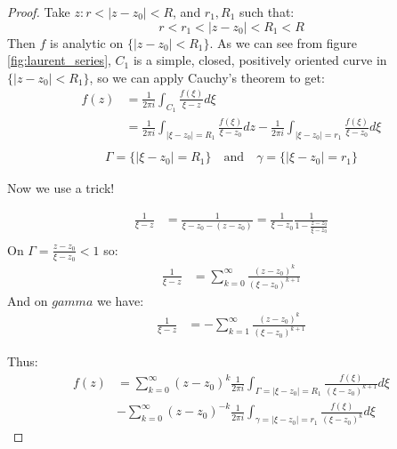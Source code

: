 \begin{proof}
    Take $z : r < |z - z_0| < R$, and $r_1, R_1$ such that:
    $$r < r_1 < |z - z_0| < R_1 < R$$
    Then $f$ is analytic on $\{|z - z_0| < R_1\}$.
    As we can see from figure \ref{fig:laurent_series}, $C_1$ is a simple, closed, positively oriented curve in $\{|z - z_0| < R_1\}$, so we can apply Cauchy's theorem to get:
    \begin{align*}
        f(z) & = \frac{1}{2\pi i} \int_{C_1} \frac{f(\xi)}{\xi - z} d\xi                                                                                          \\
             & = \frac{1}{2\pi i} \int_{|\xi - z_0| = R_1} \frac{f(\xi)}{\xi - z_0} dz  - \frac{1}{2\pi i} \int_{|\xi - z_0| = r_1} \frac{f(\xi)}{\xi - z_0} d\xi \\
    \end{align*}
    \begin{align*}
        \Gamma = \{|\xi - z_0| = R_1\} \quad \text{and} \quad \gamma = \{|\xi - z_0| = r_1\}
    \end{align*}

    Now we use a trick!

    \begin{align*}
        \frac{1}{\xi - z} & = \frac{1}{\xi - z_0 -(z - z_0)} = \frac{1}{\xi - z_0} \frac{1}{1 - \frac{z - z_0}{\xi - z_0}} \\
    \end{align*}
    On $\Gamma = \frac{z - z_0}{\xi - z_0} < 1$  so:
    \begin{align*}
        \frac{1}{\xi - z} & =  \sum_{k=0}^{\infty}\frac{(z - z_0)^{k}}{(\xi - z_0)^{k+1}}
    \end{align*}
    And on $gamma$ we have:
    \begin{align*}
        \frac{1}{\xi - z} & =  -\sum_{k=1}^{\infty}\frac{(z - z_0)^{k}}{(\xi - z_0)^{k+1}}
    \end{align*}

    Thus:
    \begin{align*}
        f(z) & = \sum_{k=0}^{\infty} (z - z_0)^k \frac{1}{2\pi i} \int_{\Gamma = |\xi - z_0| = R_1} \frac{f(\xi)}{(\xi - z_0)^{k+1}} d\xi \\
             & - \sum_{k=0}^{\infty} (z - z_0)^{-k} \frac{1}{2\pi i} \int_{\gamma = |\xi - z_0| = r_1} \frac{f(\xi)}{(\xi - z_0)^k} d\xi
    \end{align*}
\end{proof}

